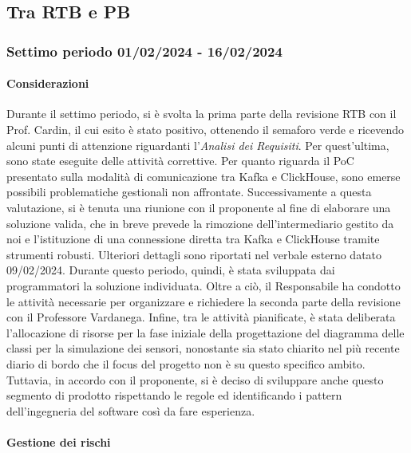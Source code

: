 \subsection{Tra RTB e PB}
\subsubsection{Settimo periodo  01/02/2024 - 16/02/2024}
\paragraph{Considerazioni}
Durante il settimo periodo, si è svolta la prima parte della revisione RTB con il Prof. Cardin, il cui esito è stato positivo, ottenendo il semaforo verde e ricevendo alcuni punti di attenzione riguardanti l'\textit{Analisi dei Requisiti}. Per quest'ultima, sono state eseguite delle attività correttive. Per quanto riguarda il PoC presentato sulla modalità di comunicazione tra Kafka e ClickHouse, sono emerse possibili problematiche gestionali non affrontate. Successivamente a questa valutazione, si è tenuta una riunione con il proponente al fine di elaborare una soluzione valida, che in breve prevede la rimozione dell'intermediario gestito da noi e l'istituzione di una connessione diretta tra Kafka e ClickHouse tramite strumenti robusti. Ulteriori dettagli sono riportati nel verbale esterno datato 09/02/2024. Durante questo periodo, quindi, è stata sviluppata dai programmatori la soluzione individuata. Oltre a ciò, il Responsabile ha condotto le attività necessarie per organizzare e richiedere la seconda parte della revisione con il Professore Vardanega. Infine, tra le attività pianificate, è stata deliberata l'allocazione di risorse per la fase iniziale della progettazione del diagramma delle classi per la simulazione dei sensori, nonostante sia stato chiarito nel più recente diario di bordo che il focus del progetto non è su questo specifico ambito. Tuttavia, in accordo con il proponente, si è deciso di sviluppare anche questo segmento di prodotto rispettando le regole ed identificando i pattern dell'ingegneria del software così da fare esperienza.
   
\paragraph{Gestione dei rischi} 

